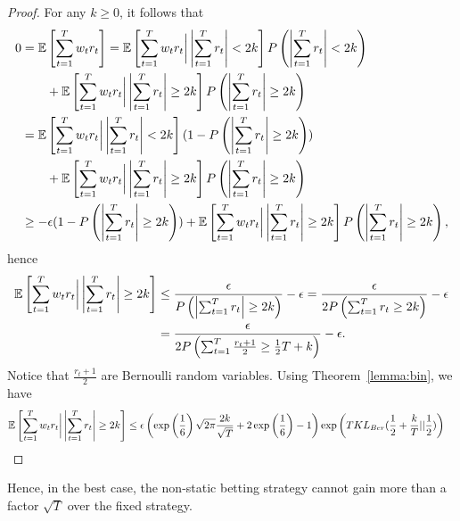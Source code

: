 \begin{proof}
For any $k\geq 0$, it follows that
\begin{align*}
0&=\mathbb{E}\left[\sum_{t=1}^T w_t r_t \right] 
= \mathbb{E}\left[\sum_{t=1}^T w_t r_t \bigg| \left|\sum_{t=1}^T r_t \right|< 2 k\right] P\left(\left|\sum_{t=1}^T r_t\right|< 2k \right)\\
&\qquad+\mathbb{E}\left[\sum_{t=1}^T w_t r_t \bigg| \left|\sum_{t=1}^T r_t \right| \geq 2 k\right] P\left(\left|\sum_{t=1}^T r_t\right|\geq 2 k\right) \\
&=\mathbb{E}\left[\sum_{t=1}^T w_t r_t \bigg| \left|\sum_{t=1}^T r_t \right|< 2 k\right] (1-P\left(\left|\sum_{t=1}^T r_t\right|\geq 2 k\right))\\
&\qquad+\mathbb{E}\left[\sum_{t=1}^T w_t r_t \bigg| \left|\sum_{t=1}^T r_t \right| \geq 2 k\right] P\left(\left|\sum_{t=1}^T r_t\right|\geq 2 k\right) \\
&\geq -\epsilon (1-P\left(\left|\sum_{t=1}^T r_t\right|\geq 2 k\right))+\mathbb{E}\left[\sum_{t=1}^T w_t r_t \bigg| \left|\sum_{t=1}^T r_t\right| \geq 2 k\right] P\left(\left|\sum_{t=1}^T r_t \right|\geq 2 k\right),
\end{align*}
hence
\begin{align*}
\mathbb{E}\left[\sum_{t=1}^T w_t r_t \bigg| \left|\sum_{t=1}^T r_t\right| \geq 2 k\right]
&\leq \frac{\epsilon}{P\left(\left|\sum_{t=1}^T r_t\right|\geq 2 k\right)} -\epsilon
= \frac{\epsilon}{2 P\left(\sum_{t=1}^T r_t \geq 2 k\right)} -\epsilon\\
&= \frac{\epsilon}{2 P\left(\sum_{t=1}^T \frac{r_t + 1}{2} \geq \frac{1}{2}T+ k \right)}-\epsilon.
\end{align*}
Notice that $\frac{r_t + 1}{2}$ are Bernoulli random variables.
Using Theorem~\ref{lemma:bin}, we have
\begin{align*}
\mathbb{E}\left[\sum_{t=1}^T w_t r_t \bigg| \left|\sum_{t=1}^T r_t\right| \geq 2 k\right]
&\leq \epsilon \left(\exp\left(\frac{1}{6}\right)\sqrt{2 \pi}\frac{2k}{\sqrt{T}} +2\exp\left(\frac{1}{6}\right)-1\right)\exp\left(T KL_{Ber}(\frac{1}{2}+\frac{k}{T}||\frac{1}{2})\right)
\end{align*}
\end{proof}

Hence, in the best case, the non-static betting strategy cannot gain more than a factor $\sqrt{T}$ over the fixed strategy.